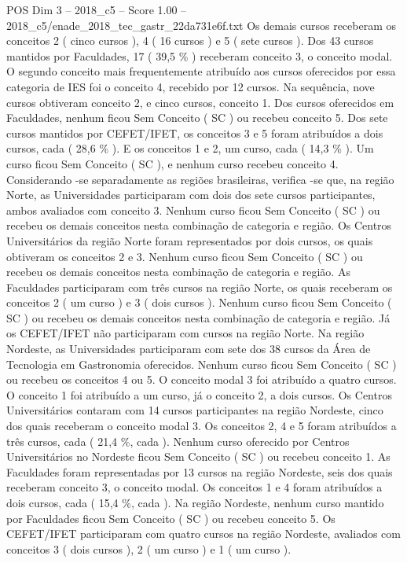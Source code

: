 \begin{textsample}{POS Dim 3 – 2018\_c5 – Score 1.00 – 2018\_c5/enade\_2018\_tec\_gastr\_22da731e6f.txt}
Os demais cursos receberam os conceitos 2 ( cinco cursos ), 4 ( 16 cursos ) e 5 ( sete cursos ).
Dos 43 cursos mantidos por Faculdades, 17 ( 39,5 \% ) receberam conceito 3, o conceito modal.
O segundo conceito mais frequentemente atribuído aos cursos oferecidos por essa categoria de IES foi o conceito 4, recebido por 12 cursos.
Na sequência, nove cursos obtiveram conceito 2, e cinco cursos, conceito 1.
Dos cursos oferecidos em Faculdades, nenhum ficou Sem Conceito ( SC ) ou recebeu conceito 5.
Dos sete cursos mantidos por CEFET/IFET, os conceitos 3 e 5 foram atribuídos a dois cursos, cada ( 28,6 \% ).
E os conceitos 1 e 2, um curso, cada ( 14,3 \% ).
Um curso ficou Sem Conceito ( SC ), e nenhum curso recebeu conceito 4.
Considerando -se separadamente as regiões brasileiras, verifica -se que, na região Norte, as Universidades participaram com dois dos sete cursos participantes, ambos avaliados com conceito 3.
Nenhum curso ficou Sem Conceito ( SC ) ou recebeu os demais conceitos nesta combinação de categoria e região.
Os Centros Universitários da região Norte foram representados por dois cursos, os quais obtiveram os conceitos 2 e 3.
Nenhum curso ficou Sem Conceito ( SC ) ou recebeu os demais conceitos nesta combinação de categoria e região.
As Faculdades participaram com três cursos na região Norte, os quais receberam os conceitos 2 ( um curso ) e 3 ( dois cursos ).
Nenhum curso ficou Sem Conceito ( SC ) ou recebeu os demais conceitos nesta combinação de categoria e região.
Já os CEFET/IFET não participaram com cursos na região Norte.
Na região Nordeste, as Universidades participaram com sete dos 38 cursos da Área de Tecnologia em Gastronomia oferecidos.
Nenhum curso ficou Sem Conceito ( SC ) ou recebeu os conceitos 4 ou 5.
O conceito modal 3 foi atribuído a quatro cursos.
O conceito 1 foi atribuído a um curso, já o conceito 2, a dois cursos.
Os Centros Universitários contaram com 14 cursos participantes na região Nordeste, cinco dos quais receberam o conceito modal 3.
Os conceitos 2, 4 e 5 foram atribuídos a três cursos, cada ( 21,4 \%, cada ).
Nenhum curso oferecido por Centros Universitários no Nordeste ficou Sem Conceito ( SC ) ou recebeu conceito 1.
As Faculdades foram representadas por 13 cursos na região Nordeste, seis dos quais receberam conceito 3, o conceito modal.
Os conceitos 1 e 4 foram atribuídos a dois cursos, cada ( 15,4 \%, cada ).
Na região Nordeste, nenhum curso mantido por Faculdades ficou Sem Conceito ( SC ) ou recebeu conceito 5.
Os CEFET/IFET participaram com quatro cursos na região Nordeste, avaliados com conceitos 3 ( dois cursos ), 2 ( um curso ) e 1 ( um curso ).

\end{textsample}
